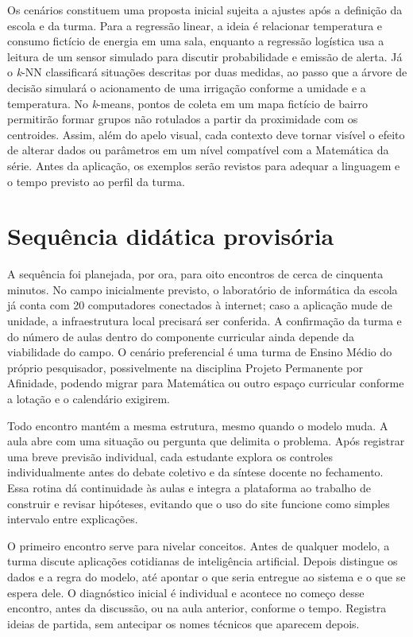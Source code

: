 Os cenários constituem uma proposta inicial sujeita a ajustes após a definição da escola e da turma. Para a regressão linear, a ideia é relacionar temperatura e consumo fictício de energia em uma sala, enquanto a regressão logística usa a leitura de um sensor simulado para discutir probabilidade e emissão de alerta. Já o \textit{k}-NN classificará situações descritas por duas medidas, ao passo que a árvore de decisão simulará o acionamento de uma irrigação conforme a umidade e a temperatura. No \textit{k}-means, pontos de coleta em um mapa fictício de bairro permitirão formar grupos não rotulados a partir da proximidade com os centroides. Assim, além do apelo visual, cada contexto deve tornar visível o efeito de alterar dados ou parâmetros em um nível compatível com a Matemática da série. Antes da aplicação, os exemplos serão revistos para adequar a linguagem e o tempo previsto ao perfil da turma.

\section{Sequência didática provisória}

A sequência foi planejada, por ora, para oito encontros de cerca de cinquenta minutos. No campo inicialmente previsto, o laboratório de informática da escola já conta com 20 computadores conectados à internet; caso a aplicação mude de unidade, a infraestrutura local precisará ser conferida. A confirmação da turma e do número de aulas dentro do componente curricular ainda depende da viabilidade do campo. O cenário preferencial é uma turma de Ensino Médio do próprio pesquisador, possivelmente na disciplina Projeto Permanente por Afinidade, podendo migrar para Matemática ou outro espaço curricular conforme a lotação e o calendário exigirem.

Todo encontro mantém a mesma estrutura, mesmo quando o modelo muda. A aula abre com uma situação ou pergunta que delimita o problema. Após registrar uma breve previsão individual, cada estudante explora os controles individualmente antes do debate coletivo e da síntese docente no fechamento. Essa rotina dá continuidade às aulas e integra a plataforma ao trabalho de construir e revisar hipóteses, evitando que o uso do site funcione como simples intervalo entre explicações.

O primeiro encontro serve para nivelar conceitos. Antes de qualquer modelo, a turma discute aplicações cotidianas de inteligência artificial. Depois distingue os dados e a regra do modelo, até apontar o que seria entregue ao sistema e o que se espera dele. O diagnóstico inicial é individual e acontece no começo desse encontro, antes da discussão, ou na aula anterior, conforme o tempo. Registra ideias de partida, sem antecipar os nomes técnicos que aparecem depois.


